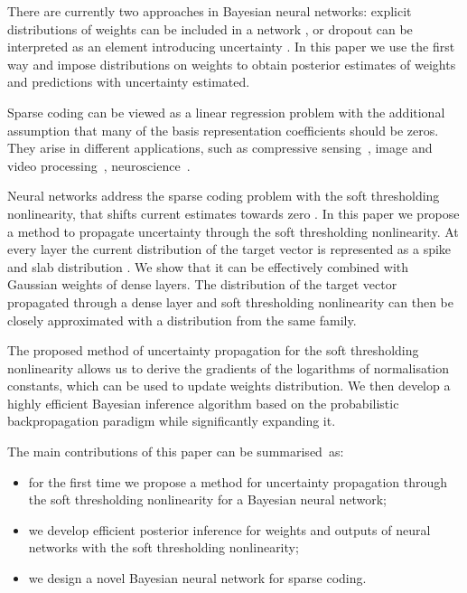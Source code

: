 \documentclass[letterpaper]{article}
\begin{document}
There are currently two approaches in Bayesian neural networks: explicit distributions of weights can be included in a network \citep{hernandez2015probabilistic, ranganath2015deep}, or dropout can be interpreted as an element introducing uncertainty \citep{gal2016dropout}. In this paper we use the first way and impose distributions on weights to obtain posterior estimates of weights and predictions with uncertainty estimated.

Sparse coding can be viewed as a linear regression problem with the additional assumption that many of the basis representation coefficients should be zeros. They arise in different applications, such as compressive sensing~\citep{candes2008introduction}, image and video processing~\citep{mairal2014sparse}, neuroscience~\citep{baillet1997bayesian, jas2017learning}. 

Neural networks address the sparse coding problem with the soft thresholding nonlinearity, that shifts current estimates towards zero \citep{gregor2010learning}. In this paper we propose a method to propagate uncertainty through the soft thresholding nonlinearity. At every layer the current distribution of the target vector is represented as a spike and slab distribution \citep{mitchell1988bayesian}. We show that it can be effectively combined with Gaussian weights of dense layers. The distribution of the target vector propagated through a dense layer and soft thresholding nonlinearity can then be closely approximated with a distribution from the same family.

The proposed method of uncertainty propagation for the soft thresholding nonlinearity allows us to derive the gradients of the logarithms of normalisation constants, which can be used to update weights distribution. We then develop a highly efficient Bayesian inference algorithm based on the probabilistic backpropagation paradigm while significantly expanding it.

The main contributions of this paper can be summarised~as: 
\begin{itemize}
\item for the first time we propose a method for uncertainty propagation through the soft thresholding nonlinearity for a Bayesian neural network;
\item we develop efficient posterior inference for weights and outputs of neural networks with the soft thresholding nonlinearity;
\item we design a novel Bayesian neural network for sparse coding.
\end{itemize}
\end{document}
